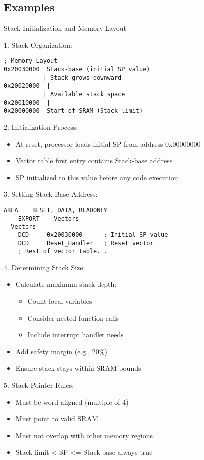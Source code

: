 \subsection{Examples}







\begin{KR}{Stack Initialization and Memory Layout}

1. Stack Organization:
\begin{lstlisting}[language=armasm, style=basesmol]
; Memory Layout
0x20030000  Stack-base (initial SP value)
           | Stack grows downward
0x20020000  |
           | Available stack space
0x20010000  |
0x20000000  Start of SRAM (Stack-limit)
\end{lstlisting}

2. Initialization Process:
\begin{itemize}
  \item At reset, processor loads initial SP from address 0x00000000
  \item Vector table first entry contains Stack-base address
  \item SP initialized to this value before any code execution
\end{itemize}

3. Setting Stack Base Address:
\begin{lstlisting}[language=armasm, style=basesmol]
    AREA    RESET, DATA, READONLY
    EXPORT  __Vectors
__Vectors
    DCD     0x20030000      ; Initial SP value
    DCD     Reset_Handler   ; Reset vector
    ; Rest of vector table...
\end{lstlisting}

4. Determining Stack Size:
\begin{itemize}
  \item Calculate maximum stack depth:
    \begin{itemize}
      \item Count local variables
      \item Consider nested function calls
      \item Include interrupt handler needs
    \end{itemize}
  \item Add safety margin (e.g., 20\%)
  \item Ensure stack stays within SRAM bounds
\end{itemize}

5. Stack Pointer Rules:
\begin{itemize}
  \item Must be word-aligned (multiple of 4)
  \item Must point to valid SRAM
  \item Must not overlap with other memory regions
  \item Stack-limit < SP <= Stack-base always true
\end{itemize}


\end{KR}
